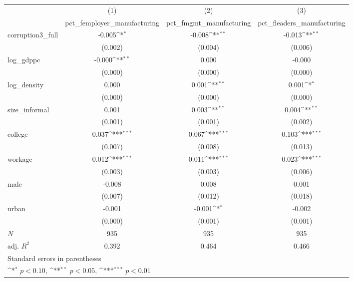 {
\def\sym#1{\ifmmode^{#1}\else\(^{#1}\)\fi}
\begin{tabular}{l*{3}{c}}
\hline\hline
            &\multicolumn{1}{c}{(1)}&\multicolumn{1}{c}{(2)}&\multicolumn{1}{c}{(3)}\\
            &\multicolumn{1}{c}{pct\_femployer\_manufacturing}&\multicolumn{1}{c}{pct\_fmgmt\_manufacturing}&\multicolumn{1}{c}{pct\_fleaders\_manufacturing}\\
\hline
corruption3\_full&      -0.005\sym{*}  &      -0.008\sym{**} &      -0.013\sym{**} \\
            &     (0.002)         &     (0.004)         &     (0.006)         \\
[1em]
log\_gdppc   &      -0.000\sym{**} &       0.000         &      -0.000         \\
            &     (0.000)         &     (0.000)         &     (0.000)         \\
[1em]
log\_density &       0.000         &       0.001\sym{**} &       0.001\sym{*}  \\
            &     (0.000)         &     (0.000)         &     (0.000)         \\
[1em]
size\_informal&       0.001         &       0.003\sym{**} &       0.004\sym{**} \\
            &     (0.001)         &     (0.001)         &     (0.002)         \\
[1em]
college     &       0.037\sym{***}&       0.067\sym{***}&       0.103\sym{***}\\
            &     (0.007)         &     (0.008)         &     (0.013)         \\
[1em]
workage     &       0.012\sym{***}&       0.011\sym{***}&       0.023\sym{***}\\
            &     (0.003)         &     (0.003)         &     (0.006)         \\
[1em]
male        &      -0.008         &       0.008         &       0.001         \\
            &     (0.007)         &     (0.012)         &     (0.018)         \\
[1em]
urban       &      -0.001         &      -0.001\sym{*}  &      -0.002         \\
            &     (0.000)         &     (0.001)         &     (0.001)         \\
\hline
\(N\)       &         935         &         935         &         935         \\
adj. \(R^{2}\)&       0.392         &       0.464         &       0.466         \\
\hline\hline
\multicolumn{4}{l}{\footnotesize Standard errors in parentheses}\\
\multicolumn{4}{l}{\footnotesize \sym{*} \(p<0.10\), \sym{**} \(p<0.05\), \sym{***} \(p<0.01\)}\\
\end{tabular}
}
